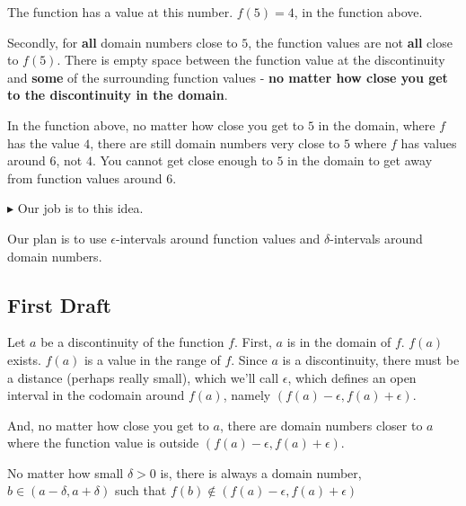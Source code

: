 \documentclass{ximera}
\begin{document}
The function has a value at this number. $f(5) = 4$, in the function above.




Secondly, for \textbf{\textcolor{purple!85!blue}{all}} domain numbers close to $5$, the function values are not \textbf{\textcolor{purple!85!blue}{all}} close to $f(5)$. There is empty space between the function value at the discontinuity and \textbf{\textcolor{purple!85!blue}{some}} of the surrounding function values - \textbf{\textcolor{red!70!black}{no matter how close you get to the discontinuity in the domain}}. 


In the function above, no matter how close you get to $5$ in the domain, where $f$ has the value $4$, there are still domain numbers very close to $5$ where $f$ has values around $6$, not $4$. You cannot get close enough to $5$ in the domain to get away from function values around $6$.



\textbf{\textcolor{red!70!darkgray}{$\blacktriangleright$}} Our job is to  this idea. 


Our plan is to use $\epsilon$-intervals around function values and $\delta$-intervals around domain numbers.



\subsection*{First Draft}



Let $a$ be a discontinuity of the function $f$.  First, $a$ is in the domain of $f$. $f(a)$ exists.  $f(a)$ is a value in the range of $f$. Since $a$ is a discontinuity, there must be a distance (perhaps really small), which we'll call $\epsilon$, which defines an open interval in the codomain around $f(a)$, namely $(f(a)-\epsilon, f(a)+\epsilon)$.  


And, no matter how close you get to $a$, there are domain numbers closer to $a$ where the function value is outside $(f(a)-\epsilon, f(a)+\epsilon)$. 



No matter how small $\delta>0$ is, there is always a domain number, $b \in (a-\delta, a+\delta)$ such that $ f(b) \not\in(f(a)-\epsilon, f(a)+\epsilon)$ 
\end{document}
